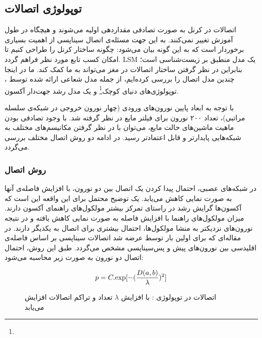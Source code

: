 \subsection{توپولوژی اتصالات}
اتصالات در کرنل به صورت تصادفی مقداردهی اولیه می‌شوند و هیچگاه در طول آموزش تغییر نمی‌کنند. به این جهت مسئله‌ی اتصال سیناپسی از اهمیت بسیاری برخوردار است که به این گونه بیان می‌شود: چگونه ساختار کرنل را طراحی کنیم تا امکان کسب تابع مورد نظر فراهم گردد. LSM یک مدل منطبق بر زیست‌شناسی است؛ بنابراین در نظر گرفتن ساختار اتصالات در مغز می‌تواند به ما کمک کند. ما در اینجا چندین مدل اتصال را بررسی کرده‌ایم، از جمله مدل شعاعی ارائه شده توسط ، توپولوژی‌های دنیای کوچک\footnote{} و یک مدل رشد جهت‌دار آکسون.

با توجه به ابعاد پایین نورون‌های ورودی (چهار نورون خروجی در شبکه‌ی سلسله مراتبی)، تعداد ۲۰۰ نورون برای فیلتر مایع در نظر گرفته شد. با وجود تصادفی بودن ماهیت ماشین‌های حالت مایع، می‌توان با در نظر گرفتن مکانیسم‌های مختلف به شبکه‌هایی پایدارتر و قابل اعتمادتر رسید. در ادامه دو روش اتصال مختلف بررسی می‌گردد.

\subsubsection{روش اتصال }
در شبکه‌های عصبی، احتمال پیدا کردن یک اتصال بین دو نورون، با افزایش فاصله‌ی آنها به صورت نمایی کاهش می‌یابد. یک توضیح محتمل برای این واقعه این است که آکسون‌ها گرایش رشد در راستای تمرکز بیشتر مولکول‌های راهنمای آکسون دارند. میزان مولکول‌های راهنما با افزایش فاصله به صورت نمایی کاهش یافته و در نتیجه نورون‌های نزدیکتر به منشا مولکول‌ها، احتمال بیشتری برای اتصال به یکدیگر دارند\cite{yamamoto2002wiring,kaiser2009simple}. در مقاله‌ای که برای اولین بار توسط  عرضه شد\cite{maass2002real} اتصالات سیناپسی بر اساس فاصله‌ی اقلیدسی بین نورون‌های پیش و پس‌سیناپسی مشخص می‌گردد. طبق این روش، احتمال اتصال دو نورون به صورت زیر محاسبه می‌شود:

\begin{equation} \label{eq:maas}
p = C.\textup{exp}[-(\frac{D(a,b)}{\lambda})^2]
\end{equation}

\begin{figure}
\centering
{\footnotesize
{}

\caption[اتصالات در توپولوژی ]{اتصالات در توپولوژی : با افزایش $\lambda$ تعداد و تراکم اتصالات افزایش می‌یابد}
\label{fig:maas}
}
\end{figure}

